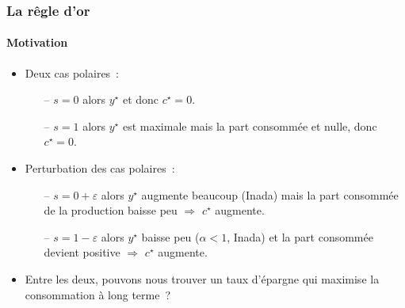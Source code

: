 \documentclass[10pt,notheorems]{beamer}
\theoremstyle{plain}
\theoremstyle{definition} %
\begin{document}
\begin{frame}
  \frametitle{La rêgle d'or}
  \framesubtitle{Motivation}

  \bigskip

  \begin{itemize}

  \item Deux cas polaires~:\newline

    \begin{itemize}
    \item[--] $s=0$ alors $y^{\star}$ et donc $c^{\star}=0$.\newline
    \item[--] $s=1$ alors $y^{\star}$ est maximale mais la part consommée et nulle, donc $c^{\star}=0$.\newline
    \end{itemize}

    \medskip

  \item Perturbation des cas polaires~:\newline

    \begin{itemize}
    \item[--] $s=0+\varepsilon$ alors $y^{\star}$ augmente beaucoup (Inada) mais la part consommée de la production baisse peu $\Rightarrow$ $c^{\star}$ augmente.\newline
    \item[--] $s=1-\varepsilon$ alors $y^{\star}$ baisse peu ($\alpha<1$, Inada) et la part consommée devient positive $\Rightarrow$ $c^{\star}$ augmente.\newline
    \end{itemize}

    \medskip

  \item Entre les deux, pouvons nous trouver un taux d'épargne qui maximise la consommation à long terme~?

  \end{itemize}

\end{frame}
\end{document}

